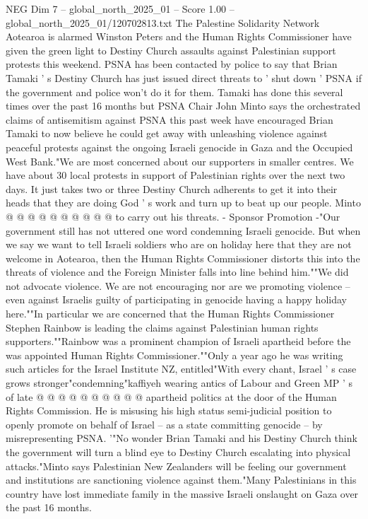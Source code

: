 \begin{textsample}{NEG Dim 7 – global\_north\_2025\_01 – Score 1.00 – global\_north\_2025\_01/120702813.txt}  \label{ex:f7_neg_188}
The Palestine Solidarity Network Aotearoa is alarmed Winston Peters and the Human Rights Commissioner have given the green light to Destiny Church assaults against Palestinian support protests this weekend.
PSNA has been contacted by police to say that Brian Tamaki ' s Destiny Church has just issued direct threats to ' shut down ' PSNA if the government and police won't do it for them.
Tamaki has done this several times over the past 16 months but PSNA Chair John Minto says the orchestrated claims of antisemitism against PSNA this past week have encouraged Brian Tamaki to now believe he could get away with unleashing violence against peaceful protests against the ongoing Israeli genocide in Gaza and the Occupied West Bank."We are most concerned about our supporters in smaller centres.
We have about 30 local protests in support of Palestinian rights over the next two days.
It just takes two or three Destiny Church adherents to get it into their heads that they are doing God ' s work and turn up to beat up our people.
Minto @ @ @ @ @ @ @ @ @ @ to carry out his threats. - Sponsor Promotion -"Our government still has not uttered one word condemning Israeli genocide.
But when we say we want to tell Israeli soldiers who are on holiday here that they are not welcome in Aotearoa, then the Human Rights Commissioner distorts this into the threats of violence and the Foreign Minister falls into line behind him.""We did not advocate violence.
We are not encouraging nor are we promoting violence -- even against Israelis guilty of participating in genocide having a happy holiday here.""In particular we are concerned that the Human Rights Commissioner Stephen Rainbow is leading the claims against Palestinian human rights supporters.""Rainbow was a prominent champion of Israeli apartheid before the was appointed Human Rights Commissioner.""Only a year ago he was writing such articles for the Israel Institute NZ, entitled"With every chant, Israel ' s case grows stronger"condemning"kaffiyeh wearing antics of Labour and Green MP ' s of late @ @ @ @ @ @ @ @ @ @ apartheid politics at the door of the Human Rights Commission.
He is misusing his high status semi-judicial position to openly promote on behalf of Israel -- as a state committing genocide -- by misrepresenting PSNA. '"No wonder Brian Tamaki and his Destiny Church think the government will turn a blind eye to Destiny Church escalating into physical attacks."Minto says Palestinian New Zealanders will be feeling our government and institutions are sanctioning violence against them."Many Palestinians in this country have lost immediate family in the massive Israeli onslaught on Gaza over the past 16 months.

\end{textsample}

